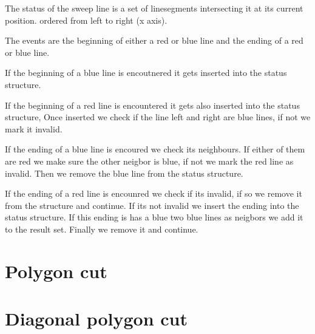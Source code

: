 \documentclass{article}
\begin{document}
The status of the sweep line is a set of linesegments intersecting it at
its current position. ordered from left to right (x axis).

The events are the beginning of either a red or blue line and the ending of
a red or blue line.

If the beginning of a blue line is encoutnered it gets inserted into the
status structure.

If the beginning of a red line is encountered it gets also
inserted into the status structure, Once inserted we check if the line left
and right are blue lines, if not we mark it invalid.

If the ending of a blue line is encoured we check its neighbours. If either
of them are red we make sure the other neigbor is blue, if not we mark the red line as invalid.
Then we remove the blue line from the status structure.

If the ending of a red line is encounred we check if its invalid,
if so we remove it from the structure and continue.
If its not invalid we insert the ending into the status structure.
If this ending is has a blue two blue lines as neigbors we add it
to the result set.
Finally we remove it and continue.
\section{Polygon cut}
\section{Diagonal polygon cut}
\end{document}
